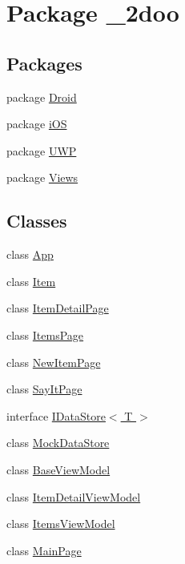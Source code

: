 \hypertarget{namespace__2doo}{
\section{Package \_\-2doo}
\label{namespace__2doo}
}
\subsection*{Packages}
\begin{CompactItemize}
\item 
package \hyperlink{namespace__2doo_1_1_droid}{Droid}
\item 
package \hyperlink{namespace__2doo_1_1i_o_s}{iOS}
\item 
package \hyperlink{namespace__2doo_1_1_u_w_p}{UWP}
\item 
package \hyperlink{namespace__2doo_1_1_views}{Views}
\end{CompactItemize}
\subsection*{Classes}
\begin{CompactItemize}
\item 
class \hyperlink{class__2doo_1_1_app}{App}
\item 
class \hyperlink{class__2doo_1_1_item}{Item}
\item 
class \hyperlink{class__2doo_1_1_item_detail_page}{ItemDetailPage}
\item 
class \hyperlink{class__2doo_1_1_items_page}{ItemsPage}
\item 
class \hyperlink{class__2doo_1_1_new_item_page}{NewItemPage}
\item 
class \hyperlink{class__2doo_1_1_say_it_page}{SayItPage}
\item 
interface \hyperlink{interface__2doo_1_1_i_data_store_3_01_t_01_4}{IDataStore$<$ T $>$}
\item 
class \hyperlink{class__2doo_1_1_mock_data_store}{MockDataStore}
\item 
class \hyperlink{class__2doo_1_1_base_view_model}{BaseViewModel}
\item 
class \hyperlink{class__2doo_1_1_item_detail_view_model}{ItemDetailViewModel}
\item 
class \hyperlink{class__2doo_1_1_items_view_model}{ItemsViewModel}
\item 
class \hyperlink{class__2doo_1_1_main_page}{MainPage}
\end{CompactItemize}
